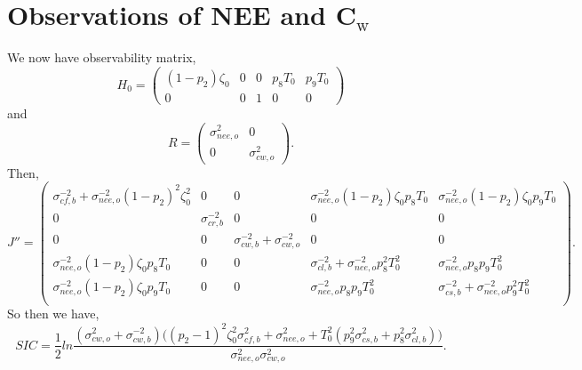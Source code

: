 \documentclass[11pt]{article}
\begin{document}
\section*{Observations of NEE and C$_\text{w}$}
We now have observability matrix,
\[
H_{0} = \begin{pmatrix}
(1-p_{2})\zeta_0 & 0 & 0 & p_{8}T_{0} & p_{9}T_{0}\\
0 & 0 & 1 & 0 & 0
\end{pmatrix}
\]
and 
\[
R= \begin{pmatrix}
\sigma_{nee,o}^{2} & 0 \\
0 & \sigma_{cw,o}^{2}
\end{pmatrix}.
\]
Then,
\[
J'' = \begin{pmatrix}
\sigma_{cf,b}^{-2}+\sigma_{nee,o}^{-2}(1-p_{2})^{2}\zeta_0^{2} & 0 & 0 & \sigma_{nee,o}^{-2}(1-p_{2})\zeta_0 p_{8}T_0 & \sigma_{nee,o}^{-2}(1-p_{2})\zeta_0 p_{9}T_0 \\
0 & \sigma_{cr,b}^{-2} & 0 & 0 & 0 \\
0 & 0 & \sigma_{cw,b}^{-2}+\sigma_{cw,o}^{-2} & 0 & 0 \\
\sigma_{nee,o}^{-2}(1-p_{2})\zeta_0 p_{8}T_0 & 0 & 0 & \sigma_{cl,b}^{-2}+\sigma_{nee,o}^{-2}p_{8}^2 T_0^2 & \sigma_{nee,o}^{-2}p_{8}p_{9} T_0^2 \\
\sigma_{nee,o}^{-2}(1-p_{2})\zeta_0 p_{9}T_0 & 0 & 0 & \sigma_{nee,o}^{-2}p_{8}p_{9} T_0^2 & \sigma_{cs,b}^{-2}+\sigma_{nee,o}^{-2}p_{9}^2 T_0^2 \\
\end{pmatrix}.
\]
So then we have,
\[
SIC = \frac{1}{2}ln\frac{(\sigma_{cw,o}^2+\sigma_{cw,b}^{-2})\big((p_{2}-1)^{2}\zeta_0^{2}\sigma_{cf,b}^{2}+\sigma_{nee,o}^{2}+T_{0}^2(p_{9}^2\sigma_{cs,b}^2+p_8^2\sigma_{cl,b}^2)\big)}{\sigma_{nee,o}^{2}\sigma_{cw,o}^2}.
\]
\end{document}
